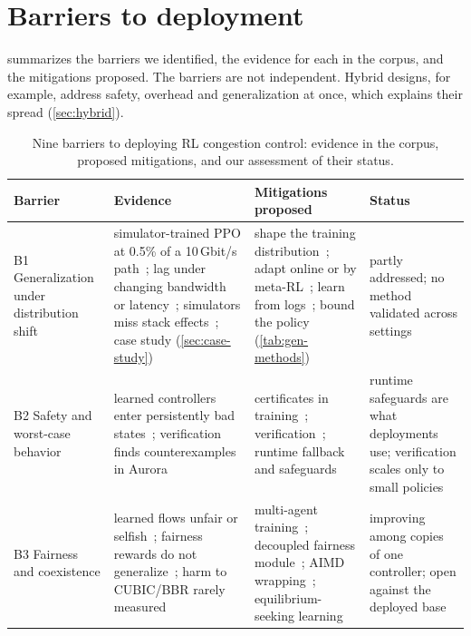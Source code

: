\section{Barriers to deployment}
\label{sec:barriers}

 summarizes the barriers we identified, the evidence for each in the corpus, and the mitigations proposed. The barriers are not independent. Hybrid designs, for example, address safety, overhead and generalization at once, which explains their spread (\cref{sec:hybrid}).

\begin{table}[p]
\centering
\caption{Nine barriers to deploying RL congestion control: evidence in the corpus, proposed mitigations, and our assessment of their status.}
\label{tab:barriers}
\scriptsize
\setlength{\tabcolsep}{3pt}
\renewcommand{\arraystretch}{1.15}
\begin{tabularx}{\linewidth}{@{}L{2.1cm}L{4.0cm}YL{2.4cm}@{}}
\toprule
Barrier & Evidence & Mitigations proposed & Status \\
\midrule
B1 Generalization under distribution shift & simulator-trained PPO at 0.5\% of a 10\,Gbit/s path~\cite{ghermezian2026ppo}; lag under changing bandwidth or latency~\cite{giacomoni2024rlcc,mazilu2025learning}; simulators miss stack effects~\cite{valentine2026emulation}; case study (\cref{sec:case-study}) & shape the training distribution~\cite{xia2022genet,patel2023plume,chen2026cclab}; adapt online or by meta-RL~\cite{zhang2020onrl,mwaura2025adaptive}; learn from logs~\cite{yen2023sage,khairy2024acm}; bound the policy~\cite{abbasloo2020orca,tian2024spine} (\cref{tab:gen-methods}) & partly addressed; no method validated across settings \\
B2 Safety and worst-case behavior & learned controllers enter persistently bad states~\cite{yang2024canopy}; verification finds counterexamples in Aurora~\cite{kazak2019verily,eliyahu2021whirl} & certificates in training~\cite{yang2024canopy}; verification~\cite{amir2024verifying,zangooei2026analyzing}; runtime fallback and safeguards~\cite{zhang2020onrl,jia2026han,zhou2025safety,rotman2020online} & runtime safeguards are what deployments use; verification scales only to small policies \\
B3 Fairness and coexistence & learned flows unfair or selfish~\cite{yamazaki2021fairness,giacomoni2024rlcc}; fairness rewards do not generalize~\cite{mazilu2025learning}; harm to CUBIC/BBR rarely measured~\cite{ware2019beyond} & multi-agent training~\cite{emara2022pareto,liao2024astraea}; decoupled fairness module~\cite{tian2025jury}; AIMD wrapping~\cite{yamazaki2021fairness}; equilibrium-seeking learning~\cite{huang2023end} & improving among copies of one controller; open against the deployed base \\

\end{tabularx}
\end{table}
